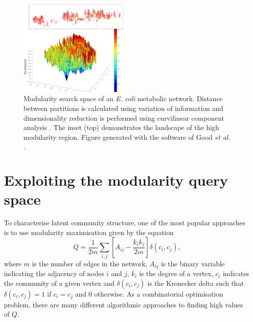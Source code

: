 \documentclass[sigconf]{acmart}
\begin{document}
\begin{figure}[t]
    \includegraphics[width=0.48\textwidth]{images/e_coli_search_space.eps}
    \caption{Modularity search space of an \textit{E. coli} metabolic network.
 Distance between partitions is calculated using variation of information \cite{meilua2003comparing} and dimensionality reduction is performed using curvilinear component analysis \cite{demartines1997curvilinear}.
  The inset (top) demonstrates the landscape of the high modularity region.
  Figure generated with the software of Good \textit{et al.} \cite{good2010performance}.}
    \label{fig:modular_search_space}
\end{figure}

\section{Exploiting the modularity query space}
To characterise latent community structure, one of the most popular approaches is to use modularity maximisation given by the equation \cite{newman2004}
\begin{equation}\label{eq:modularity}
  Q = \frac{1}{2m}\sum_{i,j} \left[A_{ij} - \frac{k_i k_j}{2m}\right]\delta(c_i, c_j),
\end{equation}
where $m$ is the number of edges in the network, $A_{ij}$ is the binary variable indicating the adjacency of nodes $i$ and $j$, $k_i$ is the degree of a vertex, $c_i$ indicates the community of a given vertex and $\delta(c_i, c_j)$ is the Kronecker delta such that $\delta(c_i, c_j) = 1$ if $c_i = c_j$ and $0$ otherwise.
As a combinatorial optimisation problem, there are many different algorithmic approaches to finding high values of $Q$.
\end{document}
